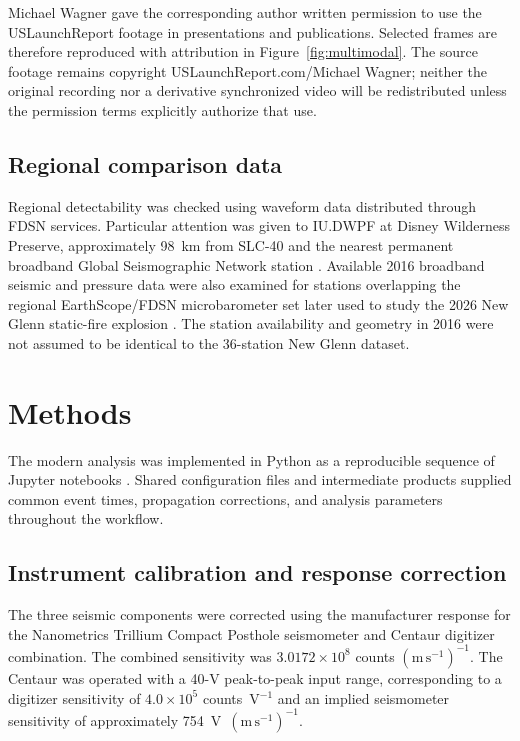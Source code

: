 \documentclass[]{seismica}
\begin{document}
Michael Wagner gave the corresponding author written permission to use the
USLaunchReport footage in presentations and publications. Selected frames are
therefore reproduced with attribution in Figure~\ref{fig:multimodal}. The
source footage remains copyright USLaunchReport.com/Michael Wagner; neither
the original recording nor a derivative synchronized video will be
redistributed unless the permission terms explicitly authorize that use.

\subsection{Regional comparison data}

Regional detectability was checked using waveform data distributed through
FDSN services. Particular attention was given to IU.DWPF at Disney Wilderness
Preserve, approximately 98~km from SLC-40 and the nearest permanent broadband
Global Seismographic Network station \citep{asl_gsn_iu_1988}. Available 2016
broadband seismic and pressure data were also examined for stations overlapping
the regional EarthScope/FDSN microbarometer set later used to study the 2026
New Glenn static-fire explosion \citep{silber_scamfer_newglenn_2026}. The
station availability and geometry in 2016 were not assumed to be identical to
the 36-station New Glenn dataset.


\section{Methods}
\label{sec:methods}

The modern analysis was implemented in Python as a reproducible sequence of
Jupyter notebooks \citep{kluyver2016jupyter}. Shared configuration files and
intermediate products supplied common event times, propagation corrections,
and analysis parameters throughout the workflow.


\subsection{Instrument calibration and response correction}

The three seismic components were corrected using the manufacturer response
for the Nanometrics Trillium Compact Posthole seismometer and Centaur digitizer
combination. The combined sensitivity was
$3.0172\times10^8$ counts $(\mathrm{m\,s^{-1}})^{-1}$. The Centaur was
operated with a 40-V peak-to-peak input range, corresponding to a digitizer
sensitivity of $4.0\times10^5$ counts~V$^{-1}$ and an implied seismometer
sensitivity of approximately 754~V~$(\mathrm{m\,s^{-1}})^{-1}$.
\end{document}
